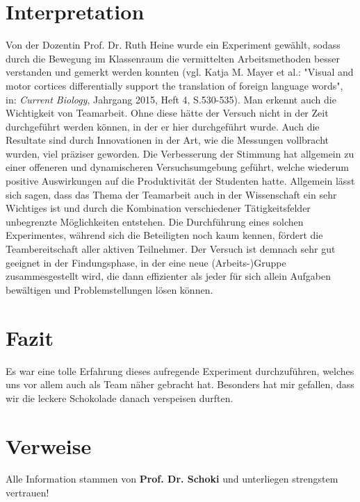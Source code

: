 \documentclass[12pt]{scrartcl}
\begin{document}
\section{Interpretation}
Von der Dozentin Prof. Dr. Ruth Heine wurde ein Experiment gewählt, sodass durch die Bewegung im Klassenraum die vermittelten Arbeitsmethoden besser verstanden und gemerkt werden konnten (vgl. Katja M. Mayer et al.: "Visual and motor cortices differentially support the translation of foreign language words", in: \textit{Current Biology}, Jahrgang 2015, Heft 4, S.530-535). Man erkennt auch die Wichtigkeit von Teamarbeit. Ohne diese hätte der Versuch nicht in der Zeit durchgeführt werden können, in der er hier durchgeführt wurde. Auch die Resultate sind durch Innovationen in der Art, wie die Messungen vollbracht wurden, viel präziser geworden. Die Verbesserung der Stimmung hat allgemein zu einer offeneren und dynamischeren Versuchsumgebung geführt, welche wiederum positive Auswirkungen auf die Produktivität der Studenten hatte. Allgemein lässt sich sagen, dass das Thema der Teamarbeit auch in der Wissenschaft ein sehr Wichtiges ist und durch die Kombination verschiedener Tätigkeitsfelder unbegrenzte Möglichkeiten entstehen. Die Durchführung eines solchen Experimentes, während sich die Beteiligten noch kaum kennen, fördert die Teambereitschaft aller aktiven Teilnehmer. Der Versuch ist demnach sehr gut geeignet in der Findungsphase, in der eine neue (Arbeits-)Gruppe zusammesgestellt wird, die dann effizienter als jeder für sich allein Aufgaben bewältigen und Problemstellungen lösen können.
\section{Fazit}
Es war eine tolle Erfahrung dieses aufregende Experiment durchzuführen, welches uns vor allem auch als Team näher gebracht hat. Besonders hat mir gefallen, dass wir die leckere Schokolade danach verspeisen durften.
\section{Verweise}
Alle Information stammen von \textbf{Prof. Dr. Schoki} und unterliegen strengstem vertrauen! 
\end{document}
